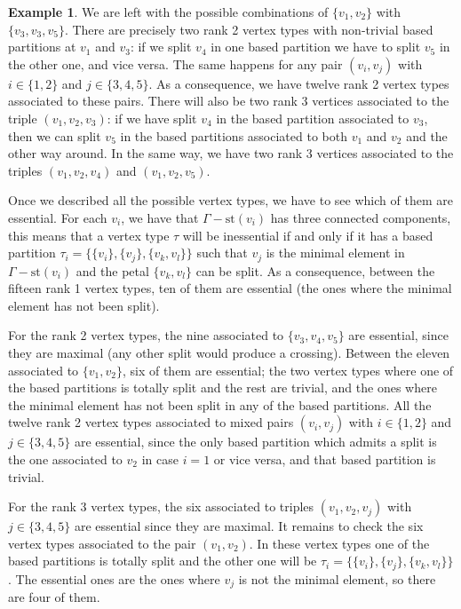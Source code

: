 \documentclass[a4paper]{amsart}
\newcommand{\G}{\Gamma}
\newcommand{\st}{\mathrm{st}}
\theoremstyle{definition}
\newtheorem{ej}[teo]{Example}
\theoremstyle{remark}
\begin{document}
\begin{ej}
    We are left with the possible combinations of $\{v_1,v_2\}$ with $\{v_3,v_3,v_5\}$. There are precisely two rank 2 vertex types with non-trivial based partitions at $v_1$ and $v_3$: if we split $v_4$ in one based partition we have to split $v_5$ in the other one, and vice versa. The same happens for any pair $(v_i,v_j)$ with $i\in\{1,2\}$ and $j\in\{3,4,5\}$. As a consequence, we  have twelve rank 2 vertex types associated to these pairs. There will also be two rank 3 vertices associated to the triple $(v_1,v_2,v_3)$: if we have split $v_4$ in the based partition associated to $v_3$, then we can split $v_5$ in  the based partitions associated to both $v_1$ and $v_2$ and the other way around. In the same way, we have two rank 3 vertices associated to the triples $(v_1,v_2,v_4)$ and $(v_1,v_2,v_5)$. 

    Once we described all the possible vertex types, we have to see which of them are essential. For each $v_i$, we have that $\G-\st(v_i)$ has three connected components, this means that a vertex type $\tau$ will be inessential if and only if it has a based partition $\tau_i=\{\{v_i\}, \{v_j\},\{v_k,v_l\}\}$ such that $v_j$ is the minimal element in $\G-\st(v_i)$ and the petal $\{v_k,v_l\}$ can be split.
    As a consequence, between the fifteen rank 1 vertex types, ten of them are essential (the ones where the minimal element has not been split). 
    
    For the rank 2  vertex types, the nine associated to $\{v_3,v_4,v_5\}$ are essential, since they are maximal (any other split would produce a crossing). Between the eleven associated to $\{v_1,v_2\}$, six of them are essential; the two vertex types where one of the based partitions is totally split and the rest are trivial, and the ones where the minimal element has not been split in any of the based partitions. All the twelve rank 2 vertex types associated to mixed pairs $(v_i,v_j)$ with $i\in\{1,2\}$ and $j\in\{3,4,5\}$ are essential, since the only based partition which admits a split is the one associated to $v_2$ in case $i=1$ or vice versa, and that based partition is trivial.

    For the rank 3  vertex types, the six associated to triples $(v_1,v_2,v_j)$ with $j\in\{3,4,5\}$ are essential since they are maximal. It remains to check the six vertex types associated to the pair $(v_1,v_2)$. In these vertex types one of the based partitions is totally split and  the other one will be $\tau_i=\{\{v_i\}, \{v_j\},\{v_k,v_l\}\}$. The essential ones are the ones where $v_j$ is not the minimal element, so there are four of them.


\end{ej}
\end{document}
